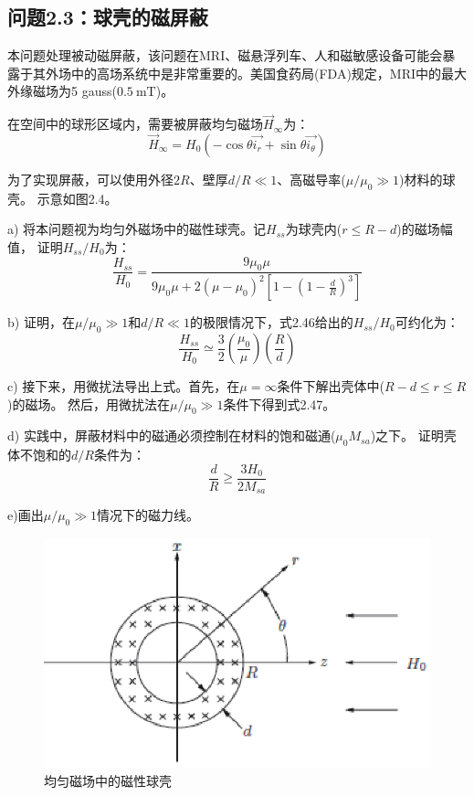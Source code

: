 \subsection{问题2.3：球壳的磁屏蔽}
本问题处理被动磁屏蔽，该问题在MRI、磁悬浮列车、人和磁敏感设备可能会暴露于其外场中的高场系统中是非常重要的。美国食药局(FDA)规定，MRI中的最大外缘磁场为5 gauss($0.5\ \mathrm{mT}$)。

在空间中的球形区域内，需要被屏蔽均匀磁场$\vec{H}_\infty$为：
\begin{equation*}
\vec{H}_\infty=H_0 (-\cos\theta \vec{i_r}+\sin\theta \vec{i_\theta})\tag{2.40}
\end{equation*}

为了实现屏蔽，可以使用外径$2R$、壁厚$d/R\ll 1$、高磁导率($\mu/\mu_0 \gg 1$)材料的球壳。
示意如图2.4。

a) 将本问题视为均匀外磁场中的磁性球壳。记$H_{ss}$为球壳内($r\le R-d$)的磁场幅值，
证明$H_{ss}/H_0$为：
\begin{equation}
\frac{H_{ss}}{H_0}=\frac{9\mu_0 \mu}{9\mu_0 \mu+2(\mu-\mu_0)^2\left[1-\left(1-\frac{d}{R}\right)^3\right]}
\end{equation}

b) 证明，在$\mu/\mu_0\gg 1$和$d/R\ll 1$的极限情况下，式2.46给出的$H_{ss}/H_0$可约化为：
\begin{equation}
\frac{H_{ss}}{H_0}\simeq \frac{3}{2}\left(\frac{\mu_0}{\mu}\right)\left(\frac{R}{d}\right)
\end{equation}

c) 接下来，用微扰法导出上式。首先，在$\mu=\infty$条件下解出壳体中($R-d\le r\le R$)的磁场。
然后，用微扰法在$\mu/\mu_0 \gg 1$条件下得到式2.47。

d) 实践中，屏蔽材料中的磁通必须控制在材料的饱和磁通($\mu_0 M_{sa}$)之下。
证明壳体不饱和的$d/R$条件为：
\begin{equation}
\frac{d}{R} \ge \frac{3H_0}{2M_{sa}}
\end{equation}

e)画出$\mu/\mu_0 \gg 1$情况下的磁力线。

\begin{figure}[htbp]
  \centering
 \includegraphics[scale=0.9]{chpt2/figs/fig2.4.eps}
  \caption{均匀磁场中的磁性球壳}
\end{figure}

